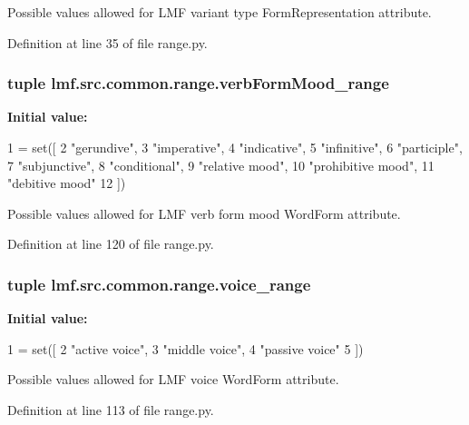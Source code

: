 Possible values allowed for L\+M\+F variant type Form\+Representation attribute. 



Definition at line 35 of file range.\+py.

\hypertarget{namespacelmf_1_1src_1_1common_1_1range_a5a57dc7ed7fa1f785e812cfe2c306ef6}{
\subsubsection[{verb\+Form\+Mood\+\_\+range}]{\setlength{\rightskip}{0pt plus 5cm}tuple lmf.\+src.\+common.\+range.\+verb\+Form\+Mood\+\_\+range}}\label{namespacelmf_1_1src_1_1common_1_1range_a5a57dc7ed7fa1f785e812cfe2c306ef6}
{\bfseries Initial value\+:}
\begin{DoxyCode}
1 = set([
2     \textcolor{stringliteral}{"gerundive"},
3     \textcolor{stringliteral}{"imperative"},
4     \textcolor{stringliteral}{"indicative"},
5     \textcolor{stringliteral}{"infinitive"},
6     \textcolor{stringliteral}{"participle"},
7     \textcolor{stringliteral}{"subjunctive"},
8     \textcolor{stringliteral}{"conditional"},
9     \textcolor{stringliteral}{"relative mood"},
10     \textcolor{stringliteral}{"prohibitive mood"},
11     \textcolor{stringliteral}{"debitive mood"}
12 ])
\end{DoxyCode}


Possible values allowed for L\+M\+F verb form mood Word\+Form attribute. 



Definition at line 120 of file range.\+py.

\hypertarget{namespacelmf_1_1src_1_1common_1_1range_a23fdc4c034bc34cab81c6b9c051074dd}{
\subsubsection[{voice\+\_\+range}]{\setlength{\rightskip}{0pt plus 5cm}tuple lmf.\+src.\+common.\+range.\+voice\+\_\+range}}\label{namespacelmf_1_1src_1_1common_1_1range_a23fdc4c034bc34cab81c6b9c051074dd}
{\bfseries Initial value\+:}
\begin{DoxyCode}
1 = set([
2     \textcolor{stringliteral}{"active voice"},
3     \textcolor{stringliteral}{"middle voice"},
4     \textcolor{stringliteral}{"passive voice"}
5 ])
\end{DoxyCode}


Possible values allowed for L\+M\+F voice Word\+Form attribute. 



Definition at line 113 of file range.\+py.

